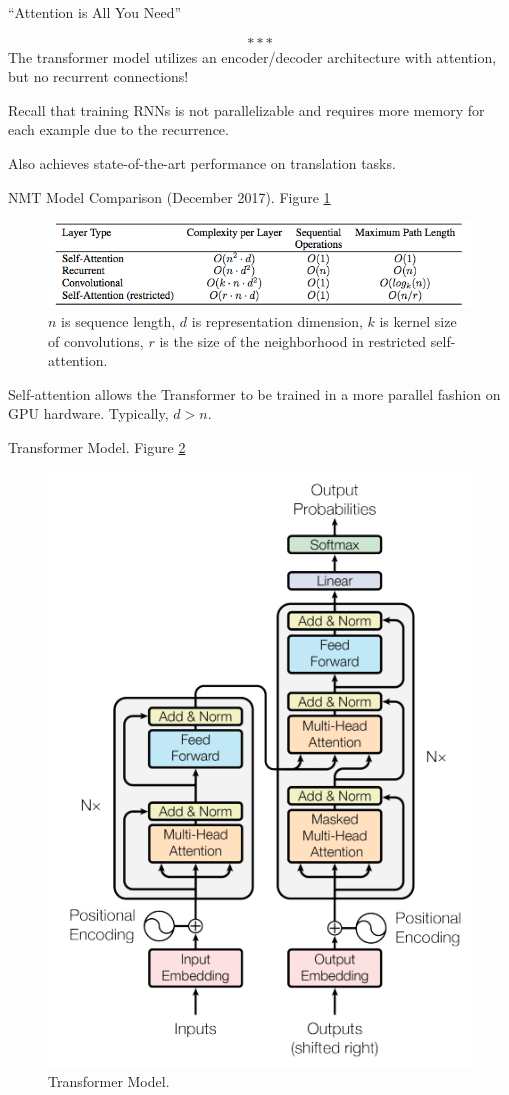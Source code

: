 \documentclass[english]{article}
\begin{document}
\begin{center}``Attention is All You Need''\end{center}
$$***$$
The transformer model utilizes an encoder/decoder architecture with attention, but no recurrent connections!
 
Recall that training RNNs is not parallelizable and requires more memory for each example due to the recurrence.
 
Also achieves state-of-the-art performance on translation tasks.
 



\item 
 {NMT Model Comparison (December 2017)}.  Figure \ref{NMT Model Comparison}

\begin{figure}
\centering
\includegraphics[height=0.15\linewidth]{nmt-compare3.png}
\caption{$n$ is sequence length, $d$ is representation dimension, $k$ is kernel size of convolutions, $r$ is the size of the neighborhood in restricted self-attention.}
    \label{NMT Model Comparison}
\end{figure}
Self-attention allows the Transformer to be trained in a more parallel fashion on GPU hardware. Typically, $d> n$.
 



\item 
 {Transformer Model}.  Figure \ref{Transformer Model}

\begin{figure}
\centering
\includegraphics[width=0.45\linewidth]{transformer2.png}
    \caption{Transformer Model.}
    \label{Transformer Model}
\end{figure} 
\end{document}
